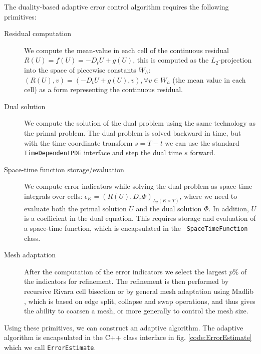 The duality-based adaptive error control algorithm requires the
following primitives:

\begin{description}
\item[Residual computation]
We compute the mean-value in each cell of the continuous residual
$R(U) = f(U) = -D_t U + g(U)$, this is computed as the
$L_2$-projection into the space of piecewise constants $W_h$: $(R(U),
v) = (-D_t U + g(U), v), \forall v \in W_h$ (the mean value in each
cell) as a form representing the continuous residual.
\item[Dual solution]
We compute the solution of the dual problem using the same technology
as the primal problem. The dual problem is solved backward in time,
but with the time coordinate transform $s = T - t$ we can use the
standard {\tt TimeDependentPDE} interface and step the dual time $s$
forward.
\item[Space-time function storage/evaluation]
We compute error indicators while solving the dual problem as
space-time integrals over cells: $\epsilon_K = (R(U),
D_x \Phi)_{L_2(K \times T)}$, where we need to evaluate both the
primal solution $U$ and the dual solution $\Phi$. In addition, $U$ is
a coefficient in the dual equation. This requires storage and
evaluation of a space-time function, which is encapsulated in the {\tt
SpaceTimeFunction} class.
\item[Mesh adaptation]
After the computation of the error indicators we select the largest
$p\%$ of the indicators for refinement. The refinement is then
performed by recursive Rivara cell bisection or by general mesh
adaptation using Madlib \cite{Comp`ereRemacleJanssonEtAl2009}, which is
based on edge split, collapse and swap operations, and thus gives
the ability to coarsen a mesh, or more generally to control the mesh
size.
\end{description}

Using these primitives, we can construct an adaptive algorithm. The
adaptive algorithm is encapsulated in the C++ class interface in
fig. \ref{code:ErrorEstimate} which we call {\tt ErrorEstimate}.

